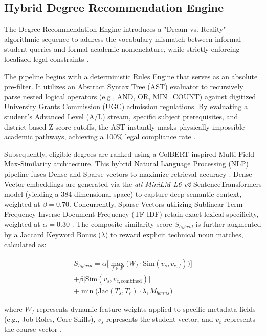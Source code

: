 \documentclass[conference]{IEEEtran}
\begin{document}
\subsection{Hybrid Degree Recommendation Engine}
The Degree Recommendation Engine introduces a "Dream vs. Reality" algorithmic sequence to address the vocabulary mismatch between informal student queries and formal academic nomenclature, while strictly enforcing localized legal constraints \cite{seu2024stream, island2025admission}.

The pipeline begins with a deterministic Rules Engine that serves as an absolute pre-filter. It utilizes an Abstract Syntax Tree (AST) evaluator to recursively parse nested logical operators (e.g., AND, OR, MIN\_COUNT) against digitized University Grants Commission (UGC) admission regulations. By evaluating a student's Advanced Level (A/L) stream, specific subject prerequisites, and district-based Z-score cutoffs, the AST instantly masks physically impossible academic pathways, achieving a 100\% legal compliance rate \cite{ugc2024overview}.

Subsequently, eligible degrees are ranked using a ColBERT-inspired Multi-Field Max-Similarity architecture. This hybrid Natural Language Processing (NLP) pipeline fuses Dense and Sparse vectors to maximize retrieval accuracy \cite{chen2021dynamic}. Dense Vector embeddings are generated via the \textit{all-MiniLM-L6-v2} SentenceTransformers model (yielding a 384-dimensional space) to capture deep semantic context, weighted at $\beta = 0.70$. Concurrently, Sparse Vectors utilizing Sublinear Term Frequency-Inverse Document Frequency (TF-IDF) retain exact lexical specificity, weighted at $\alpha = 0.30$ \cite{zheng2025enhancing}. The composite similarity score $S_{hybrid}$ is further augmented by a Jaccard Keyword Bonus ($\lambda$) to reward explicit technical noun matches, calculated as:

\begin{multline}
S_{hybrid} = \alpha \Big[ \max_{f \in F} \big( W_f \cdot \text{Sim}(v_s, v_{c,f}) \big) \Big] \\
+ \beta \big[ \text{Sim}(v_s, v_{c, \text{combined}}) \big] \\
+ \min\big(\text{Jac}(T_s, T_c) \cdot \lambda, M_{bonus}\big) \label{eq:hybrid_score}
\end{multline}

where $W_f$ represents dynamic feature weights applied to specific metadata fields (e.g., Job Roles, Core Skills), $v_s$ represents the student vector, and $v_c$ represents the course vector \cite{chen2025integrating}.
\end{document}
